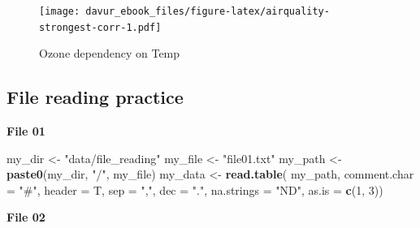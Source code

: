 \documentclass[]{book}
\newenvironment{Shaded}{\begin{snugshade}}{\end{snugshade}}
\newcommand{\CharTok}[1]{\textcolor[rgb]{0.31,0.60,0.02}{#1}}
\newcommand{\DataTypeTok}[1]{\textcolor[rgb]{0.13,0.29,0.53}{#1}}
\newcommand{\DecValTok}[1]{\textcolor[rgb]{0.00,0.00,0.81}{#1}}
\newcommand{\KeywordTok}[1]{\textcolor[rgb]{0.13,0.29,0.53}{\textbf{#1}}}
\newcommand{\NormalTok}[1]{#1}
\newcommand{\StringTok}[1]{\textcolor[rgb]{0.31,0.60,0.02}{#1}}
\begin{document}
\begin{figure}
\centering
\texttt{[image: davur\_ebook\_files/figure-latex/airquality-strongest-corr-1.pdf]}
\caption{\label{fig:airquality-strongest-corr}Ozone dependency on Temp}
\end{figure}

\hypertarget{file-reading-practice-1}{%
\subsection{File reading practice}\label{file-reading-practice-1}}

\textbf{File 01}

\begin{Shaded}
\begin{Highlighting}[]
\NormalTok{my_dir <-}\StringTok{ "data/file_reading"}
\NormalTok{my_file <-}\StringTok{ "file01.txt"}
\NormalTok{my_path <-}\StringTok{ }\KeywordTok{paste0}\NormalTok{(my_dir, }\StringTok{"/"}\NormalTok{, my_file)}
\NormalTok{my_data <-}\StringTok{ }\KeywordTok{read.table}\NormalTok{(}
\NormalTok{    my_path,}
    \DataTypeTok{comment.char =} \StringTok{"#"}\NormalTok{,}
    \DataTypeTok{header =}\NormalTok{ T,}
    \DataTypeTok{sep =} \StringTok{","}\NormalTok{,}
    \DataTypeTok{dec =} \StringTok{"."}\NormalTok{,}
    \DataTypeTok{na.strings =} \StringTok{"ND"}\NormalTok{,}
    \DataTypeTok{as.is =} \KeywordTok{c}\NormalTok{(}\DecValTok{1}\NormalTok{, }\DecValTok{3}\NormalTok{))}
\end{Highlighting}
\end{Shaded}

\textbf{File 02}

\begin{Shaded}
\end{Shaded}
\end{document}
